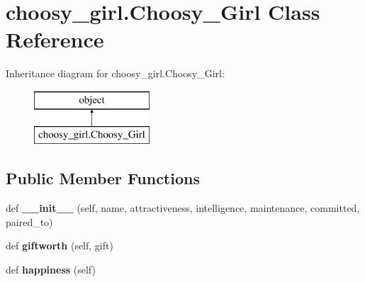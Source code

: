 \hypertarget{classchoosy__girl_1_1_choosy___girl}{}\section{choosy\+\_\+girl.\+Choosy\+\_\+\+Girl Class Reference}
\label{classchoosy__girl_1_1_choosy___girl}
Inheritance diagram for choosy\+\_\+girl.\+Choosy\+\_\+\+Girl\+:\begin{figure}[H]
\begin{center}
\leavevmode
\includegraphics[height=2.000000cm]{classchoosy__girl_1_1_choosy___girl}
\end{center}
\end{figure}
\subsection*{Public Member Functions}
\begin{DoxyCompactItemize}
\item 
\mbox{\label{classchoosy__girl_1_1_choosy___girl_af359f24e40dd32cd42b4e556957c4398}} 
def {\bfseries \+\_\+\+\_\+init\+\_\+\+\_\+} (self, name, attractiveness, intelligence, maintenance, committed, paired\+\_\+to)
\item 
\mbox{\label{classchoosy__girl_1_1_choosy___girl_a0ca3f882f7db874f3d9a8910e1200610}} 
def {\bfseries giftworth} (self, gift)
\item 
\mbox{\label{classchoosy__girl_1_1_choosy___girl_a02611ddf51ba90e2d483ba3895258b5d}} 
def {\bfseries happiness} (self)
\end{DoxyCompactItemize}
